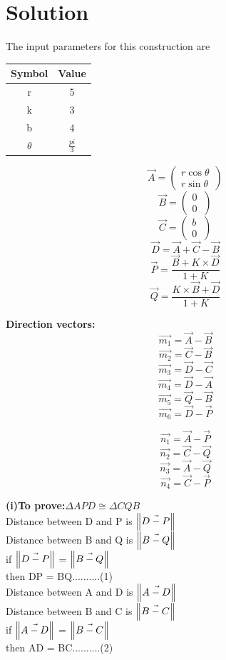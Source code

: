 \documentclass[10pt, a4paper]{article}
\begin{document}
\section{Solution}
\begin{center}
The input parameters for this construction are
\begin{tabular}{|c|c|}
	\hline
	\textbf{Symbol}&\textbf{Value}\\
	\hline
	r&5\\
	\hline
	k&3\\
	\hline
    b&4\\
	\hline
	$\theta$&$\frac{pi}{3}$\\
	\hline
\end{tabular}
\boldmath
$$\vec{A}=\begin{pmatrix} r\cos\theta\\ r\sin\theta\ \end{pmatrix}$$
$$\vec{B}=\begin{pmatrix} 0\\ 0\ \end{pmatrix}$$
$$\vec{C}=\begin{pmatrix} b\\ 0\ \end{pmatrix}$$
$$\vec{D}={\vec{A}+\vec{C}-\vec{B}}$$
$$\vec{P} =  \frac{\vec{B} +K\times \vec{D}}{1+K}$$
$$\vec{Q} =  \frac{K\times\vec{B} +\vec{D}}{1+K}$$ 
\unboldmath
\end{center}

\textbf{Direction vectors:}
\boldmath
$$\vec{m_1}={\vec{A}-\vec{B}} $$
$$\vec{m_2}={\vec{C}-\vec{B}} $$
$$\vec{m_3}={\vec{D}-\vec{C}} $$
$$\vec{m_4}={\vec{D}-\vec{A}} $$
$$\vec{m_5}={\vec{Q}-\vec{B}} $$
$$\vec{m_6}={\vec{D}-\vec{P}} $$

$$\vec{n_1}={\vec{A}-\vec{P}} $$
$$\vec{n_2}={\vec{C}-\vec{Q}} $$
$$\vec{n_3}={\vec{A}-\vec{Q}} $$
$$\vec{n_4}={\vec{C}-\vec{P}} $$

\unboldmath
\textbf{(i)To prove:}$\Delta APD \cong \Delta CQB$  \\ 
    Distance between D and P is $\norm{\vec{D-P}}$\\
	Distance between B and Q is $\norm{\vec{B-Q}}$\\
	if $\norm{\vec{D-P}}$ =  $\norm{\vec{B-Q}}$\\
	then DP = BQ..........(1)\\

    Distance between A and D is $\norm{\vec{A-D}}$\\
	Distance between B and C is $\norm{\vec{B-C}}$\\
	if $\norm{\vec{A-D}}$ =  $\norm{\vec{B-C}}$\\
	then AD = BC..........(2)\\
\end{document}
